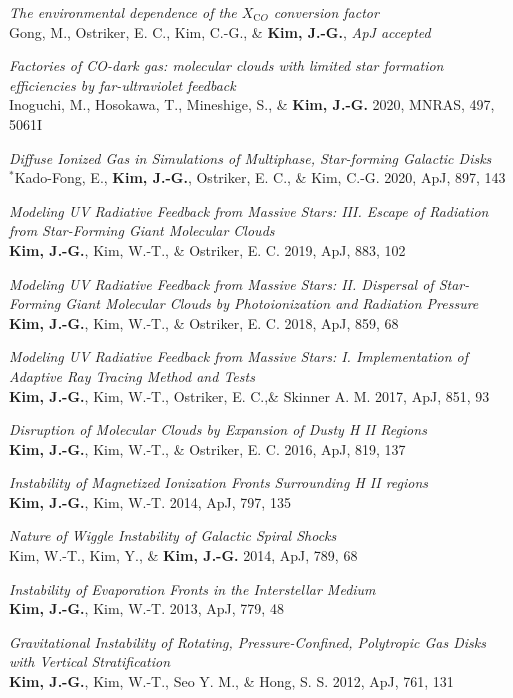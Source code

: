 \begin{benumerate}{11}
\item \textit{The environmental dependence of the $X_{\mathrm CO}$ conversion
    factor}\\ Gong, M., Ostriker, E. C., Kim, C.-G., \& \textbf{Kim,
    J.-G.}, \textit{ApJ accepted}
\item \textit{Factories of CO-dark gas: molecular clouds with limited star
formation efficiencies by far-ultraviolet feedback} \\
  Inoguchi, M., Hosokawa, T., Mineshige, S., \& \textbf{Kim, J.-G.} 2020, MNRAS,
  497, 5061I
\item \textit{Diffuse Ionized Gas in Simulations of Multiphase, Star-forming
    Galactic Disks}\\
  $^{*}$Kado-Fong, E., \textbf{Kim, J.-G.}, Ostriker, E. C., \& Kim, C.-G. 2020, ApJ,
  897, 143
\item \textit{Modeling UV Radiative Feedback from Massive Stars: III. Escape
    of Radiation from Star-Forming Giant Molecular Clouds} \\ \textbf{Kim,
    J.-G.}, Kim, W.-T., \& Ostriker, E. C. 2019, ApJ, 883, 102
\item \textit{Modeling UV Radiative Feedback from Massive Stars: II. Dispersal
of Star-Forming Giant Molecular Clouds by Photoionization and Radiation
Pressure} \\ \textbf{Kim, J.-G.}, Kim, W.-T., \& Ostriker, E. C. 2018, ApJ, 859,
68
\item \textit{Modeling UV Radiative Feedback from Massive Stars: I.
Implementation of Adaptive Ray Tracing Method and Tests}\\ \textbf{Kim, J.-G.},
Kim, W.-T., Ostriker, E. C.,\& Skinner A. M. 2017, ApJ, 851, 93
\item \textit{Disruption of Molecular Clouds by Expansion of Dusty H II
Regions}\\ \textbf{Kim, J.-G.}, Kim, W.-T., \& Ostriker, E. C. 2016, ApJ, 819,
137
\item \textit{Instability of Magnetized Ionization Fronts Surrounding H II
regions}\\ \textbf{Kim, J.-G.}, Kim, W.-T. 2014, ApJ, 797, 135
\item \textit{Nature of Wiggle Instability of Galactic Spiral Shocks}\\ Kim,
W.-T., Kim, Y., \& \textbf{Kim, J.-G.} 2014, ApJ, 789, 68
\item \textit{Instability of Evaporation Fronts in the Interstellar Medium}\\
  \textbf{Kim, J.-G.}, Kim, W.-T. 2013, ApJ, 779, 48
\item \textit{Gravitational Instability of Rotating, Pressure-Confined,
    Polytropic Gas Disks with Vertical Stratification} \\ \textbf{Kim, J.-G.},
  Kim, W.-T., Seo Y. M., \& Hong, S. S. 2012, ApJ, 761, 131
\end{benumerate}

